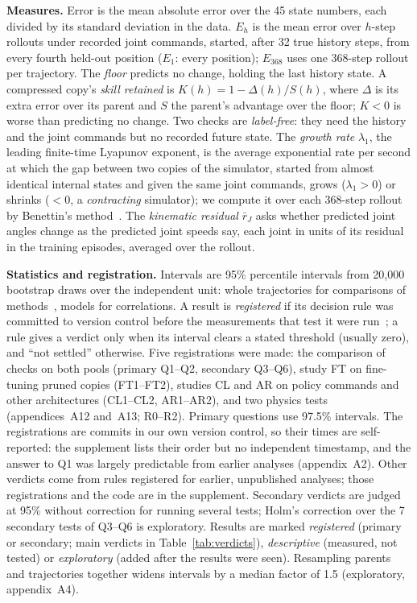 \textbf{Measures.} Error is the mean absolute error over the 45 state numbers, each divided by its standard deviation
in the data. $E_h$ is the mean error over $h$-step rollouts under recorded joint commands, started, after 32 true history steps, from every fourth
held-out position ($E_1$: every position); $E_{368}$ uses one 368-step rollout per trajectory. The \emph{floor}
predicts no change, holding the last history state. A compressed copy's \emph{skill retained} is $K(h)=1-\Delta(h)/S(h)$,
where $\Delta$ is its extra error over its parent and $S$ the parent's advantage over the floor; $K<0$ is worse than
predicting no change. Two checks are \emph{label-free}: they need the history and the joint commands but no recorded
future state. The \emph{growth rate} $\lambda_1$, the leading finite-time Lyapunov exponent, is the average
exponential rate per second at which the gap between two copies of the simulator, started from almost identical
internal states and given the same joint commands, grows ($\lambda_1>0$) or shrinks ($<0$, a \emph{contracting}
simulator); we compute it over each 368-step rollout by Benettin's method~\cite{benettin1980}. The \emph{kinematic
residual} $\bar r_J$ asks whether predicted joint angles change as the predicted joint speeds say, each joint in units
of its residual in the training episodes, averaged over the rollout.

\textbf{Statistics and registration.} Intervals are 95\% percentile intervals from 20{,}000 bootstrap draws over
the independent unit: whole trajectories for comparisons of methods~\cite{cameron2008,agarwal2021}, models for
correlations. A result is \emph{registered} if its decision rule was committed to version control before the
measurements that test it were run~\cite{nosek2018prereg}; a rule gives a verdict only when its interval clears a stated threshold
(usually zero), and ``not settled'' otherwise. Five registrations were made: the comparison of checks
on both pools (primary Q1--Q2, secondary Q3--Q6), study FT on fine-tuning pruned copies (FT1--FT2), studies CL
and AR on policy commands and other architectures (CL1--CL2, AR1--AR2), and two physics tests (appendices~A12 and~A13; R0--R2). Primary questions use 97.5\% intervals. The registrations are
commits in our own version control, so their times are self-reported: the supplement lists their order but
no independent timestamp, and the answer to Q1 was largely predictable from earlier analyses (appendix~A2). Other verdicts come from rules registered for earlier,
unpublished analyses; those registrations and the code are in the supplement. Secondary
verdicts are judged at 95\% without correction for running several tests; Holm's correction over the 7 secondary tests of Q3--Q6
is exploratory. Results are marked \emph{registered} (primary or secondary; main verdicts in Table~\ref{tab:verdicts}),
\emph{descriptive} (measured, not tested) or \emph{exploratory} (added after the results were seen). Resampling parents and trajectories together widens intervals by a median factor of
1.5 (exploratory, appendix~A4).

